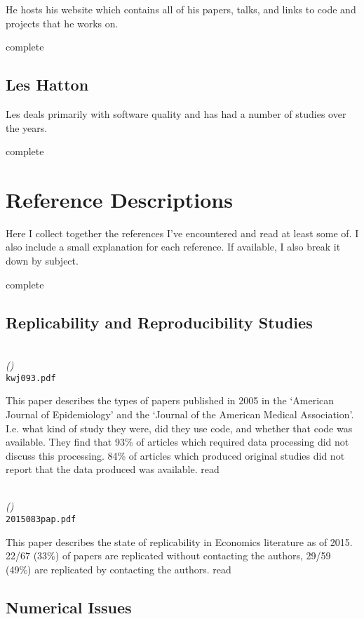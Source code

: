 \documentclass{article}
\newcommand{\Read}{
	\gls{read}
}
\newcommand{\complete}{
	\gls{complete}
}
\newenvironment{refdef}[2] {
	\noindent \textbf{\citetitle{#1}} \cite{#1}\\ \citejournalorbooktitle{#1} \textit{(\citeyear{#1})}\\ \texttt{#2} \vspace{0.2in} \par 
} {
\vspace{0.2in}
}
\begin{document}
He hosts his website\cite{david-bailey-site} which contains all of his papers, talks, and links to code and projects that he works on.

\complete

\subsection{Les Hatton}

Les deals primarily with software quality and has had a number of studies over the years.

\complete

\section{Reference Descriptions}

Here I collect together the references I've encountered and read at least some of. I also include a small explanation for each reference. If available, I also break it down by subject.

\complete

\subsection{Replicability and Reproducibility Studies}

\begin{refdef}{doi:10.1093/aje/kwj093}{kwj093.pdf}
This paper describes the types of papers published in 2005 in the `American Journal of Epidemiology' and the `Journal of the American Medical Association'. I.e. what kind of study they were, did they use code, and whether that code was available. They find that 93\% of articles which required data processing did not discuss this processing. 84\% of articles which produced original studies did not report that the data produced was available. \Read
\end{refdef}

\begin{refdef}{economics-replicability-fed}{2015083pap.pdf}
This paper describes the state of replicability in Economics literature as of 2015. 22/67 (33\%) of papers are replicated without contacting the authors, 29/59 (49\%) are replicated by contacting the authors. \Read
\end{refdef}

\subsection{Numerical Issues}
\end{document}
